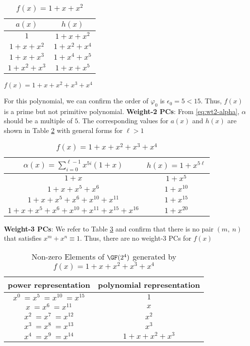 \begin{example}
\begin{table}[htbp]
 \caption{$f(x)=1+x+x^2$}
\centering
 \begin{tabular}{c c} 
 \hline
 $a(x)$ & $h(x)$\\ [0.5ex] 
 \hline\hline
$1$ & $1+x+x^2$\\ 
\hline
$1+x+x^2$ &  $1+x^2+x^4$\\
\hline
$1+x+x^3$ & $1+x^4+x^5$\\
\hline
$1+x^2+x^3$ & $1+x+x^5$ 
 \end{tabular}
 \label{novelTab8}
\end{table}


\label{ex-1}
\end{example}




\begin{example}
$f(x)=1+x+x^2+x^3+x^4$

For this polynomial, we can confirm the order of $\varphi_0$ is $\epsilon_0=5< 15$. Thus, $f(x)$ is a prime but not primitive polynomial.
\newline
\textbf{Weight-2 PCs}: 
From \eqref{eq:wt2-alpha}, $\alpha$ should be a multiple of $5$. The corresponding values for $a(x)$ and $h(x)$ are shown in Table \ref{novelTab3} with general forms for $\ell>1$

\begin{table}[htbp]
\caption{$f(x)=1+x+x^2+x^3+x^4$}
\centering
\begin{tabular}{c c} 
 \hline
 $\alpha(x)=\sum_{i=0}^{\ell-1} x^{5i}(1+x)$ & $h(x)=1+x^{5\ell}$  \\ [0.5ex] 
 \hline\hline
$1+x$ &$1+x^5$\\ 
$1+x+x^5+x^6$ &$1+x^{10}$  \\
$1+x+x^5+x^6+x^{10}+x^{11}$ & $1+x^{15}$ \\
$1+x+x^5+x^6+x^{10}+x^{11}+x^{15}+x^{16}$ &$1+x^{20}$  
 \end{tabular}
 \label{novelTab3}
\end{table}
\newpage
\textbf{Weight-3 PCs}:
We refer to Table \ref{novelTabWt3-2} and confirm that there is no pair $(m,~n)$ that satisfies $x^m+x^n \equiv 1$. Thus, there are no weight-3 PCs for $f(x)$
 \begin{table}[htbp]
 \caption{Non-zero Elements of $\GF (2^4)$ generated by $f(x)=1+x+x^2+x^3+x^4$}
\centering
 \begin{tabular}{c c} 
 \hline
 power representation & polynomial representation \\ [0.5ex] 
 \hline\hline
$x^0~=x^5~=x^{10}~=x^{15}$ & $1$\\
\hline
$x~=x^6~=x^{11}$ & $x$\\
\hline
$x^2~=x^7~=x^{12}$ &  $x^2$\\
\hline
$x^3~=x^8~=x^{13}$ &  $x^3$\\
\hline
$x^4~=x^9~=x^{14}$ &  $1+x+x^2+x^3$\\
\hline
 \end{tabular}
 \label{novelTabWt3-2}
\end{table}
\label{ex-2}
\end{example}

